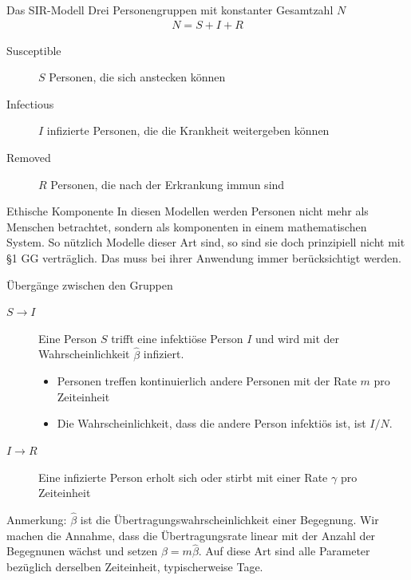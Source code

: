 \begin{frame}{Das SIR-Modell}
  Drei Personengruppen mit konstanter Gesamtzahl $N$
  \begin{gather*}
    N = S+I+R
  \end{gather*}
  \begin{description}
  \item[Susceptible] $S$ Personen, die sich anstecken können
  \item[Infectious] $I$ infizierte Personen, die die Krankheit weitergeben können
  \item[Removed] $R$ Personen, die nach der Erkrankung immun sind
  \end{description}
  \pause
  \begin{block}{Ethische Komponente}
    In diesen Modellen werden Personen nicht mehr als Menschen
    betrachtet, sondern als komponenten in einem mathematischen
    System. So nützlich Modelle dieser Art sind, so sind sie doch
    prinzipiell nicht mit §1 GG verträglich. Das muss bei ihrer
    Anwendung immer berücksichtigt werden.
  \end{block}
\end{frame}

\begin{frame}{Übergänge zwischen den Gruppen}
  \begin{description}
  \item[$S\to I$] Eine Person $S$ trifft eine infektiöse Person $I$ und wird mit
    der Wahrscheinlichkeit $\hat \beta$ infiziert.
    \begin{itemize}
    \item Personen treffen kontinuierlich andere Personen mit der Rate $m$ pro Zeiteinheit
    \item Die Wahrscheinlichkeit, dass die andere Person infektiös ist, ist $I/N$.
    \end{itemize}
  \item[$I\to R$] Eine infizierte Person erholt sich oder stirbt mit
    einer Rate $\gamma$ pro Zeiteinheit
  \end{description}
  \pause Anmerkung: $\hat\beta$ ist die Übertragungswahrscheinlichkeit
  einer Begegnung. Wir machen die Annahme, dass die Übertragungsrate
  linear mit der Anzahl der Begegnunen wächst und setzen
  $\beta = m \hat\beta$. Auf diese Art sind alle Parameter bezüglich
  derselben Zeiteinheit, typischerweise Tage.
\end{frame}


